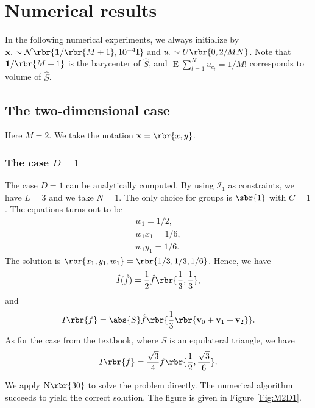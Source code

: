 \documentclass[english, nochinese]{pnote}
\DeclareMathOperator{\ope}{\mathrm{E}}
\begin{document}
\section{Numerical results}

In the following numerical experiments, we always initialize by $ \mathbf{x}_{\cdot} \sim \mathcal{N} \rbr{ \mathbf{1} / \rbr{ M + 1 }, 10^{-4} \mathbf{I} } $ and $ u_{\cdot} \sim U \rbr{ 0, 2 / M N } $. Note that $ \mathbf{1} / \rbr{ M + 1 } $ is the barycenter of $\hat{S}$, and $ \ope \sum_{ t = 1 }^N u_{c_t} = 1 / M ! $ corresponds to volume of $\hat{S}$.

\subsection{The two-dimensional case}

Here $ M = 2 $. We take the notation $ \mathbf{x} = \rbr{ x, y } $.

\subsubsection{The case $ D = 1 $}

The case $ D = 1 $ can be analytically computed. By using $\mathcal{I}_1$ as constraints, we have $ L = 3 $ and we take $ N = 1 $. The only choice for groups is $\sbr{1}$ with $ C = 1 $. The equations turns out to be
\begin{gather}
w_1 = 1 / 2, \\
w_1 x_1 = 1 / 6, \\
w_1 y_1 = 1 / 6.
\end{gather}
The solution is $ \rbr{ x_1, y_1, w_1 } = \rbr{ 1 / 3, 1 / 3, 1 / 6 } $. Hence, we have
\begin{equation}
\hat{I} (\hat{f}) = \frac{1}{2} \hat{f} \rbr{ \frac{1}{3}, \frac{1}{3} },
\end{equation}
and
\begin{equation}
I \rbr{f} = \abs{S} \hat{f} \rbr{ \frac{1}{3} \rbr{ \mathbf{v}_0 + \mathbf{v}_1 + \mathbf{v}_2 } }.
\end{equation}
As for the case from the textbook, where $S$ is an equilateral triangle, we have
\begin{equation}
I \rbr{f} = \frac{\sqrt{3}}{4} f \rbr{ \frac{1}{2}, \frac{\sqrt{3}}{6} }.
\end{equation}

We apply $ \text{N} \rbr{30} $ to solve the problem directly. The numerical algorithm succeeds to yield the correct solution. The figure is given in Figure \ref{Fig:M2D1}.
\end{document}
